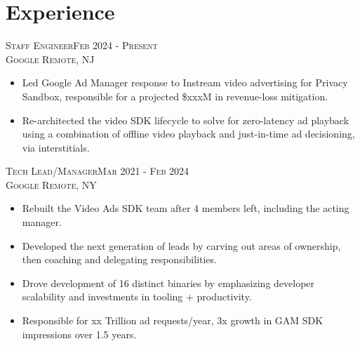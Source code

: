 \section{Experience}
\textsc{Staff Engineer\hfill Feb 2024 - Present\\}
\textsc{Google \hfill Remote, NJ\\}
\begin{itemize}
	\setlength{\itemsep}{1pt}
	\setlength{\parskip}{0pt}
	\setlength{\parsep}{0pt}
	\setlength{\leftmargin}{-5mm}
  \item Led Google Ad Manager response to Instream video advertising for Privacy Sandbox, responsible for a projected \$xxxM in revenue-loss mitigation.
  \item Re-architected the video SDK lifecycle to solve for zero-latency ad playback using a combination of offline video playback and just-in-time ad decisioning, via interstitials.
\end{itemize}

\textsc{Tech Lead/Manager\hfill Mar 2021 - Feb 2024\\}
\textsc{Google \hfill Remote, NY\\}
\begin{itemize}
	\setlength{\itemsep}{1pt}
	\setlength{\parskip}{0pt}
	\setlength{\parsep}{0pt}
	\setlength{\leftmargin}{-5mm}
  \item Rebuilt the Video Ads SDK team after 4 members left, including the acting manager.
  \item Developed the next generation of leads by carving out areas of ownership, then coaching and delegating responsibilities.
  \item Drove development of 16 distinct binaries by emphasizing developer scalability and investments in tooling + productivity.
  \item Responsible for xx Trillion ad requests/year, 3x growth in GAM SDK impressions over 1.5 years.
\end{itemize}

